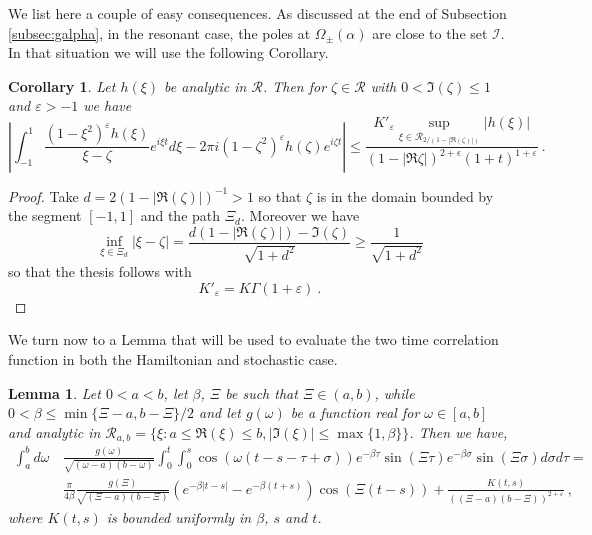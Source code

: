 \documentclass[11pt]{article}
\numberwithin{equation}{section}
\newtheorem{coro}[theorem]{Corollary}
\newtheorem{lemma}[theorem]{Lemma}
\numberwithin{theorem}{section}
\newcommand{\e}{\varepsilon}
\newcommand{\dam}{\beta}
\begin{document}
We list here a couple of easy consequences. As discussed at the end of Subsection \ref{subsec:galpha}, in the resonant
case, the poles at $\Omega_\pm(\alpha)$ are close to the set $\mathcal I$. In that situation we will use the following
Corollary.

\begin{coro}\label{cor:stimasing}
 Let $h(\xi)$ be analytic in $\mathcal R$. Then for $\zeta\in \mathcal R$ with $0<\Im(\zeta)\leq 1$ and $\e>-1$ we have
\begin{equation}\label{eq:fintsing}
\left |\int_{-1}^1 \frac{(1-\xi^2)^{\e}h(\xi)}{\xi-\zeta}e^{i
\xi t}d\xi-2\pi i(1-\zeta^2)^\e h(\zeta)e^{i\zeta t}\right|\leq
\frac{K'_{\e}\sup_{\xi\in
\mathcal R_{2/(1-|\Re(\zeta)|)}}|h(\xi)|}{(1-|\Re{\zeta}|)^{2+\epsilon}(1+t)^{1+\e}}\ .
\end{equation}
\end{coro}

\begin{proof}
Take $d=2(1-|\Re(\zeta)|)^{-1}>1$ so that $\zeta$ is in the domain bounded by the segment $[-1,1]$ and the path $\Xi_d$. Moreover we have 
\[
\inf_{\xi\in \Xi_d} |\xi-\zeta|=\frac{d(1-|\Re(\zeta)|)-\Im(\zeta)}{\sqrt{1+d^2}}\geq 
\frac{1}{\sqrt{1+d^2}}
\]
so that the thesis follows with
\[
K'_{\e}=K\Gamma(1+\e)\ .
\]
\end{proof}


We turn now to a Lemma that will be used to evaluate the two time correlation function in both the Hamiltonian and
stochastic case.

\begin{lemma}\label{lem:duhamel}
Let $0<a<b$, let $\dam$, $\Xi$ be such that $\Xi\in(a,b)$, while $0<\dam\leq \min\{\Xi-a,b-\Xi\}/2$ and let $g(\omega)$ be a function real for
$\omega\in [a,b]$ and analytic in $\mathcal R_{a,b}= \{\xi: a\le
\Re(\xi)\le b, |\Im(\xi)|\le \max\{1,\dam\}\}$. Then we have,
\begin{equation}\label{eq:duha}
\begin{aligned}
 \int_{a}^{b}d\omega\, &\frac{g(\omega)}{\sqrt{(\omega-a)(b-\omega)}} 
 \int_0^t\int_0^s\cos(\omega(t-s-\tau+\sigma))
 e^{-\dam \tau}\sin(\Xi\tau)e^{-\dam\sigma}\sin(\Xi\sigma)d\sigma d\tau=\\
&\frac{\pi}{4\dam}\frac{g(\Xi)}{\sqrt{(\Xi-a)(b-\Xi)}}  
\left(e^{-\dam|t-s|}-e^{-\dam(t+s)}\right)\cos(\Xi(t-s))+
\frac{K(t,s)}{\left((\Xi-a)(b-\Xi)\right)^{2+\e}}\ ,
\end{aligned}
\end{equation}
where $K(t,s)$ is bounded uniformly in $\beta$, $s$ and $t$.
\end{lemma}
\end{document}
